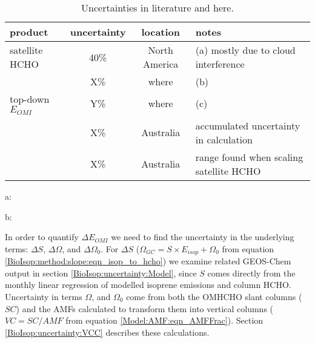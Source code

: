     \begin{table}\begin{threeparttable}
      \caption{Uncertainties in literature and here.}
      \begin{tabular}{ l | c  c  l } 
        \toprule
        product & uncertainty & location & notes \\
        \midrule
        satellite HCHO & 40\% & North America & (a) mostly due to cloud interference \\
         & X\% & where & (b) \\
        top-down $E_{OMI}$ & Y\% & where & (c) \\
         & X\% & Australia & accumulated uncertainty in calculation \\
         & X\% & Australia & range found when scaling satellite HCHO \\
        \bottomrule
      \end{tabular}
      \begin{tablenotes} 
        \item a: \textcite{Millet2006,Palmer2006}
        \item b: 
      \end{tablenotes}
      \label{BioIsop:uncertainty:eomi:tab_lit_uncertainties}
    \end{threeparttable}\end{table}
    
    In order to quantify $\Delta{E_{OMI}}$ we need to find the uncertainty in the underlying terms: $\Delta{S}$, $\Delta{\Omega}$, and $\Delta{\Omega_0}$. 
    For $\Delta{S}$ ($\Omega_{GC} = S \times E_{isop} + \Omega_0$ from equation \ref{BioIsop:method:slope:eqn_isop_to_hcho}) we examine related GEOS-Chem output in section \ref{BioIsop:uncertainty:Model}, since $S$ comes directly from the monthly linear regression of modelled isoprene emissions and column HCHO.
    Uncertainty in terms $\Omega$, and $\Omega_0$ come from both the OMHCHO slant columns ($SC$) and the AMFs calculated to transform them into vertical columns ($VC = SC/AMF$ from equation \ref{Model:AMF:eqn_AMFFrac}).
    Section \ref{BioIsop:uncertainty:VCC} describes these calculations.
    
